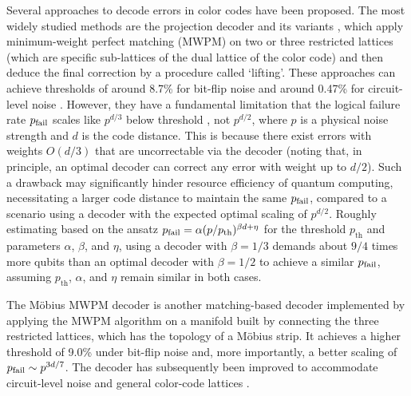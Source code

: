 \documentclass[a4paper,twocolumn,11pt,accepted=2025-01-21]{quantumarticle}
\theoremstyle{definition}
\theoremstyle{definition}
\theoremstyle{definition}
\begin{document}
Several approaches to decode errors in color codes have been proposed.  The most widely studied methods are the projection decoder and its variants \cite{delfosse2014decoding,chamberland2020triangular,beverland2021cost,kubica2023efficient,zhang2024facilitating}, which apply minimum-weight perfect matching (MWPM) on two or three restricted lattices (which are specific sub-lattices of the dual lattice of the color code) and then deduce the final correction by a procedure called `lifting'.
These approaches can achieve thresholds of around 8.7\% for bit-flip noise \cite{delfosse2014decoding} and around 0.47\% for circuit-level noise \cite{zhang2024facilitating}.
However, they have a fundamental limitation that the logical failure rate $p_{\mathrm{fail}}$ scales like $p^{d/3}$ below threshold \cite{beverland2021cost,sahay2022decoder,zhang2024facilitating}, not $p^{d/2}$, where $p$ is a physical noise strength and $d$ is the code distance.
This is because there exist errors with weights $O(d/3)$ that are uncorrectable via the decoder (noting that, in principle, an optimal decoder can correct any error with weight up to $d/2$).
Such a drawback may significantly hinder resource efficiency of quantum computing, necessitating a larger code distance to maintain the same $p_{\mathrm{fail}}$, compared to a scenario using a decoder with the expected optimal scaling of $p^{d/2}$.
Roughly estimating based on the ansatz $p_{\mathrm{fail}} = \alpha (p/p_\mathrm{th})^{\beta d + \eta}$ for the threshold $p_\mathrm{th}$ and parameters $\alpha$, $\beta$, and $\eta$, using a decoder with $\beta = 1/3$ demands about $9/4$ times more qubits than an optimal decoder with $\beta=1/2$ to achieve a similar $p_{\mathrm{fail}}$, assuming $p_\mathrm{th}$, $\alpha$, and $\eta$ remain similar in both cases.

The Möbius MWPM decoder \cite{sahay2022decoder} is another matching-based decoder implemented by applying the MWPM algorithm on a manifold built by connecting the three restricted lattices, which has the topology of a Möbius strip.
It achieves a higher threshold of 9.0\% under bit-flip noise and, more importantly, a better scaling of $p_{\mathrm{fail}} \sim p^{3d/7}$.
The decoder has subsequently been improved to accommodate circuit-level noise and general color-code lattices \cite{gidney2023new}.
\end{document}

